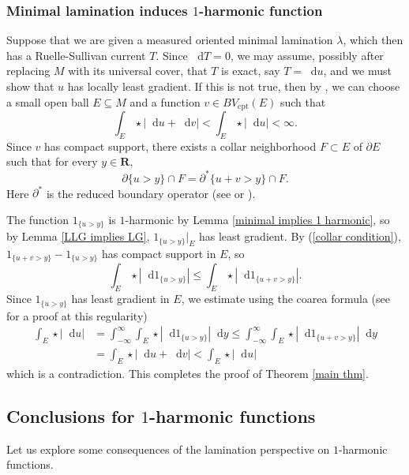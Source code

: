 \documentclass[reqno,11pt]{amsart}
\newcommand{\RR}{\mathbf{R}}
\newcommand*\dif{\mathop{}\!\mathrm{d}}
\newcommand{\cpt}{\mathrm{cpt}}
\theoremstyle{definition}
\numberwithin{equation}{section}
\begin{document}

\subsubsection{Minimal lamination induces \texorpdfstring{$1$-harmonic}{one-harmonic} function}
Suppose that we are given a measured oriented minimal lamination $\lambda$, which then has a Ruelle-Sullivan current $T$.
Since $\dif T = 0$, we may assume, possibly after replacing $M$ with its universal cover, that $T$ is exact, say $T = \dif u$, and we must show that $u$ has locally least gradient.
If this is not true, then by \cite[Theorem 2.2]{Sternberg93}, we can choose a small open ball $E \subseteq M$ and a function $v \in BV_\cpt(E)$ such that
$$\int_E \star |\dif u + \dif v| < \int_E \star |\dif u| < \infty.$$
Since $v$ has compact support, there exists a collar neighborhood $F \subset E$ of $\partial E$ such that for every $y \in \RR$,
\begin{equation}\label{collar condition}
	\partial \{u > y\} \cap F = \partial^* \{u + v > y\} \cap F.
\end{equation}
Here $\partial^*$ is the reduced boundary operator (see \cite[Chapter 3]{Giusti77} or \cite[\S2]{BackusFLG}).

The function $1_{\{u > y\}}$ is $1$-harmonic by Lemma \ref{minimal implies 1 harmonic}, so by Lemma \ref{LLG implies LG}, $1_{\{u > y\}}|_E$ has least gradient.
By (\ref{collar condition}), $1_{\{u + v > y\}} - 1_{\{u > y\}}$ has compact support in $E$, so 
$$\int_E \star |\dif 1_{\{u > y\}}| \leq \int_E \star |\dif 1_{\{u + v > y\}}|.$$
Since $1_{\{u > y\}}$ has least gradient in $E$, we estimate using the coarea formula (see \cite[Proposition 2.5]{BackusFLG} for a proof at this regularity)
\begin{align*}
\int_E \star |\dif u| &= \int_{-\infty}^\infty \int_E \star |\dif 1_{\{u > y\}}| \dif y \leq \int_{-\infty}^\infty \int_E \star |\dif 1_{\{u + v > y\}}| \dif y \\
&= \int_E \star |\dif u + \dif v| < \int_E \star |\dif u|
\end{align*}
which is a contradiction.
This completes the proof of Theorem \ref{main thm}.

\subsection{Conclusions for \texorpdfstring{$1$-harmonic}{one-harmonic} functions}\label{1harmonic apps}
Let us explore some consequences of the lamination perspective on $1$-harmonic functions.
\end{document}
